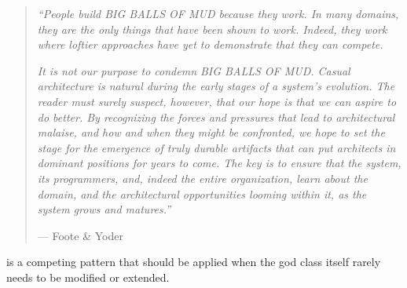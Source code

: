 \documentclass[a4paper,10pt,twoside]{book}
\begin{document}
\begin{quotation}
\noindent
\emph{``People build BIG BALLS OF MUD because they work. In many domains, they are the only things that have been shown to work. Indeed, they work where loftier approaches have yet to demonstrate that they can compete.}

\emph{It is not our purpose to condemn BIG BALLS OF MUD. Casual architecture is natural during the early stages of a system's evolution. The reader must surely suspect, however, that our hope is that we can aspire to do better. By recognizing the forces and pressures that lead to architectural malaise, and how and when they might be confronted, we hope to set the stage for the emergence of truly durable artifacts that can put architects in dominant positions for years to come. The key is to ensure that the system, its programmers, and, indeed the entire organization, learn about the domain, and the architectural opportunities looming within it, as the system grows and matures.''}

\hfill --- Foote \& Yoder \cite{Foot00a}
\end{quotation}

 is a competing pattern that should be applied when the god class itself rarely needs to be modified or extended.

\ifx\wholebook\relax\else
   
   
   
\end{document}
